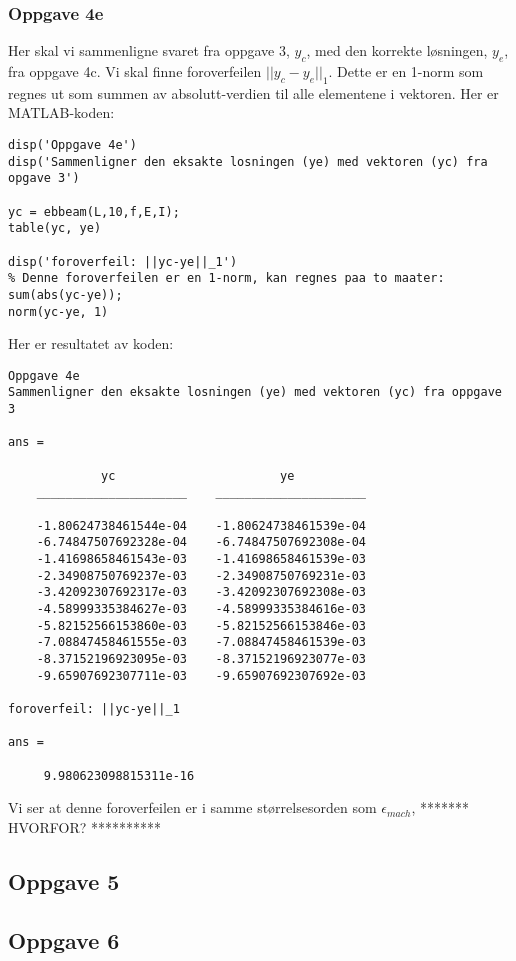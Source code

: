 \subsubsection{Oppgave 4e}
Her skal vi sammenligne svaret fra oppgave 3, $y_c$, med den korrekte løsningen, $y_e$, fra oppgave 4c. Vi skal finne foroverfeilen $||y_c-y_e||_1$. Dette er en 1-norm som regnes ut som summen av absolutt-verdien til alle elementene i vektoren. Her er MATLAB-koden:
\begin{lstlisting}
disp('Oppgave 4e')
disp('Sammenligner den eksakte losningen (ye) med vektoren (yc) fra opgave 3')

yc = ebbeam(L,10,f,E,I);
table(yc, ye)

disp('foroverfeil: ||yc-ye||_1')
% Denne foroverfeilen er en 1-norm, kan regnes paa to maater:
sum(abs(yc-ye));
norm(yc-ye, 1)
\end{lstlisting}
Her er resultatet av koden:
\begin{lstlisting}
Oppgave 4e
Sammenligner den eksakte losningen (ye) med vektoren (yc) fra oppgave 3

ans = 

             yc                       ye          
    _____________________    _____________________

    -1.80624738461544e-04    -1.80624738461539e-04
    -6.74847507692328e-04    -6.74847507692308e-04
    -1.41698658461543e-03    -1.41698658461539e-03
    -2.34908750769237e-03    -2.34908750769231e-03
    -3.42092307692317e-03    -3.42092307692308e-03
    -4.58999335384627e-03    -4.58999335384616e-03
    -5.82152566153860e-03    -5.82152566153846e-03
    -7.08847458461555e-03    -7.08847458461539e-03
    -8.37152196923095e-03    -8.37152196923077e-03
    -9.65907692307711e-03    -9.65907692307692e-03

foroverfeil: ||yc-ye||_1

ans =

     9.980623098815311e-16
\end{lstlisting}
Vi ser at denne foroverfeilen er i samme størrelsesorden som $\epsilon_{mach}$, ******* HVORFOR? **********

\subsection{Oppgave 5}


\subsection{Oppgave 6}
